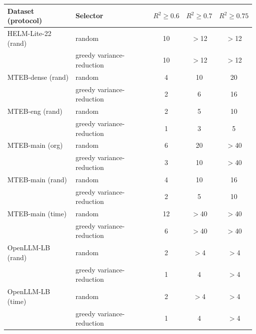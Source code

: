 \begin{tabular}{llccc}\toprule
Dataset (protocol) & Selector & $R^2\ge0.6$ & $R^2\ge0.7$ & $R^2\ge0.75$ \\\midrule
HELM-Lite-22 (rand) & random & 10 & $>$12 & $>$12 \\
 & greedy variance-reduction & 10 & $>$12 & $>$12 \\
MTEB-dense (rand) & random & 4 & 10 & 20 \\
 & greedy variance-reduction & 2 & 6 & 16 \\
MTEB-eng (rand) & random & 2 & 5 & 10 \\
 & greedy variance-reduction & 1 & 3 & 5 \\
MTEB-main (org) & random & 6 & 20 & $>$40 \\
 & greedy variance-reduction & 3 & 10 & $>$40 \\
MTEB-main (rand) & random & 4 & 10 & 16 \\
 & greedy variance-reduction & 2 & 5 & 10 \\
MTEB-main (time) & random & 12 & $>$40 & $>$40 \\
 & greedy variance-reduction & 6 & $>$40 & $>$40 \\
OpenLLM-LB (rand) & random & 2 & $>$4 & $>$4 \\
 & greedy variance-reduction & 1 & 4 & $>$4 \\
OpenLLM-LB (time) & random & 2 & $>$4 & $>$4 \\
 & greedy variance-reduction & 1 & 4 & $>$4 \\
\bottomrule
\end{tabular}
